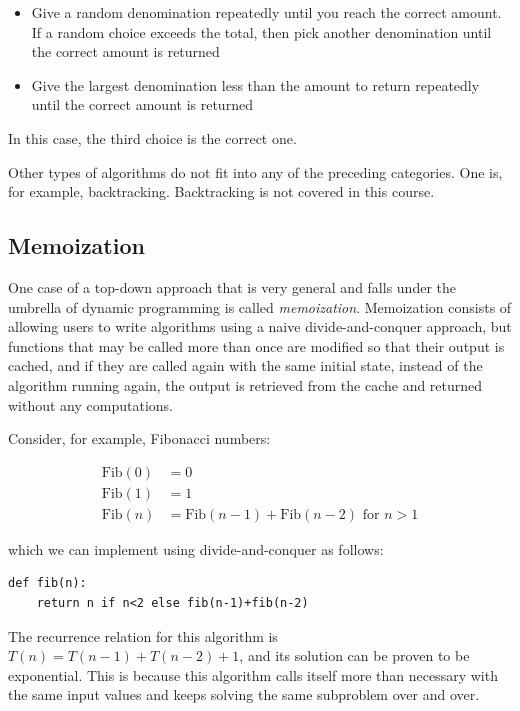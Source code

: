 \documentclass[justified,sixbynine]{tufte-book}
\theoremstyle{plain}%
\theoremstyle{definition}
\theoremstyle{remark}
\begin{document}
\begin{fullwidth}
\begin{itemize}
\item Give a random denomination repeatedly until you reach the correct amount. If a random choice exceeds the total, then pick another denomination until the correct amount is returned

\item Give the largest denomination less than the amount to return repeatedly until the correct amount is returned
\end{itemize}

In this case, the third choice is the correct one.

Other types of algorithms do not fit into any of the preceding
categories. One is, for example, backtracking. Backtracking is not covered
in this course.

\goodbreak\subsection{Memoization}


One case of a top-down approach that is very general and falls under the umbrella of dynamic programming is called {\it memoization}. Memoization consists of allowing users to write algorithms using a naive divide-and-conquer approach, but functions that may be called more than once are modified so that their output is cached, and if they are called again with the same initial state, instead of the algorithm running again, the output is retrieved from the cache and returned without any computations.


Consider, for example, Fibonacci numbers:

\begin{align}
\textrm{Fib}(0) &= 0\\
\textrm{Fib}(1) &= 1\\
\textrm{Fib}(n) &= \textrm{Fib}(n-1)+\textrm{Fib}(n-2)\textrm{ for }n>1
\end{align}

which we can implement using divide-and-conquer as follows:

\begin{lstlisting}
def fib(n):
    return n if n<2 else fib(n-1)+fib(n-2)
\end{lstlisting}

The recurrence relation for this algorithm is $T(n)=T(n-1)+T(n-2)+1$, and its solution can be proven to be exponential. This is because this algorithm calls itself more than necessary with the same input values and keeps solving the same subproblem over and over.


\end{fullwidth}
\end{document}
